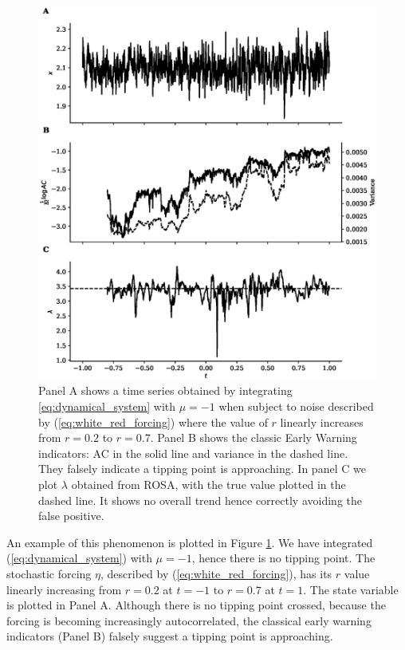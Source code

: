 \begin{figure}
\includegraphics[width=\textwidth,keepaspectratio]{figure2.eps}
\caption[Early Warning Signal False Positive]{Panel A shows a time series obtained by integrating  \cref{eq:dynamical_system} with $\mu = -1$ when subject to
  noise described by (\ref{eq:white_red_forcing}) where the
  value of $r$ linearly increases from $r=0.2$ to $r=0.7$. Panel B 
  shows the classic Early Warning indicators: AC in the solid
  line and variance in the dashed line. They falsely indicate a
  tipping point is approaching. In panel C we plot $\lambda$ obtained
  from ROSA, with the true value plotted in the dashed line. It shows
  no overall trend hence correctly avoiding the false positive.}\label{fig:changing_forcing}
\end{figure}


An example of this phenomenon is plotted in Figure
\cref{fig:changing_forcing}. We have integrated 
(\cref{eq:dynamical_system}) with $\mu = -1$, hence there is no 
tipping point. The stochastic forcing $\eta$, described by (\cref{eq:white_red_forcing}), has its $r$ value
linearly increasing
from $r=0.2$ at $t=-1$ to $r=0.7$ at $t=1$. The state
variable is plotted in Panel A. Although there is no
tipping point crossed, because the forcing is becoming 
increasingly autocorrelated, the classical early warning indicators 
(Panel B) falsely suggest a tipping point is approaching.

